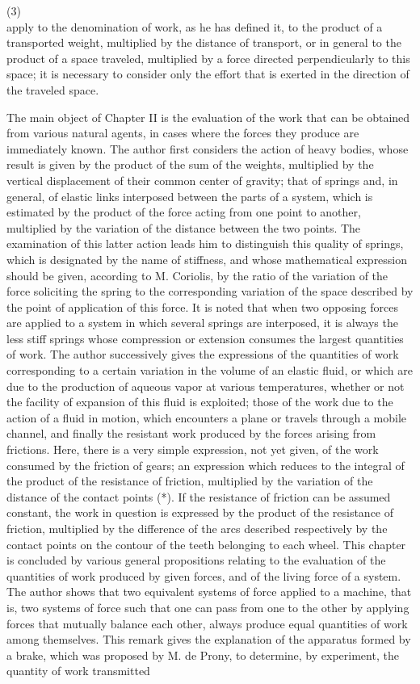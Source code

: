 \documentclass{book}
\begin{document}
\newpage
(3)\\
apply to the denomination of work, as he has defined it, to the product of a transported weight, multiplied by the distance of transport, or in general to the product of a space traveled, multiplied by a force directed perpendicularly to this space; it is necessary to consider only the effort that is exerted in the direction of the traveled space.

The main object of Chapter II is the evaluation of the work that can be obtained from various natural agents, in cases where the forces they produce are immediately known. The author first considers the action of heavy bodies, whose result is given by the product of the sum of the weights, multiplied by the vertical displacement of their common center of gravity; that of springs and, in general, of elastic links interposed between the parts of a system, which is estimated by the product of the force acting from one point to another, multiplied by the variation of the distance between the two points. The examination of this latter action leads him to distinguish this quality of springs, which is designated by the name of stiffness, and whose mathematical expression should be given, according to M. Coriolis, by the ratio of the variation of the force soliciting the spring to the corresponding variation of the space described by the point of application of this force. It is noted that when two opposing forces are applied to a system in which several springs are interposed, it is always the less stiff springs whose compression or extension consumes the largest quantities of work. The author successively gives the expressions of the quantities of work corresponding to a certain variation in the volume of an elastic fluid, or which are due to the production of aqueous vapor at various temperatures, whether or not the facility of expansion of this fluid is exploited; those of the work due to the action of a fluid in motion, which encounters a plane or travels through a mobile channel, and finally the resistant work produced by the forces arising from frictions. Here, there is a very simple expression, not yet given, of the work consumed by the friction of gears; an expression which reduces to the integral of the product of the resistance of friction, multiplied by the variation of the distance of the contact points (*). If the resistance of friction can be assumed constant, the work in question is expressed by the product of the resistance of friction, multiplied by the difference of the arcs described respectively by the contact points on the contour of the teeth belonging to each wheel. This chapter is concluded by various general propositions relating to the evaluation of the quantities of work produced by given forces, and of the living force of a system. The author shows that two equivalent systems of force applied to a machine, that is, two systems of force such that one can pass from one to the other by applying forces that mutually balance each other, always produce equal quantities of work among themselves. This remark gives the explanation of the apparatus formed by a brake, which was proposed by M. de Prony, to determine, by experiment, the quantity of work transmitted 
\end{document}
